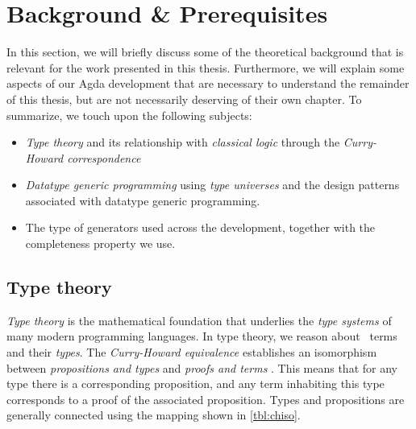 \documentclass[a4paper,msc,twosized=semi]{uustthesis}
\let\oldemph\emph
\renewcommand\emph[1]{{\large\oldemph{#1}}}
\begin{document}
\chapter{Background \& Prerequisites}
In this section, we will briefly discuss some of the theoretical background that is relevant for the work presented in this thesis. Furthermore, we will explain some aspects of our Agda development that are necessary to understand the remainder of this thesis, but are not necessarily deserving of their own chapter. To summarize, we touch upon the following subjects:

\begin{itemize}
  \item
    \emph{Type theory} and its relationship with \emph{classical logic} through the 
    \emph{Curry-Howard correspondence}

  \item 
    \emph{Datatype generic programming} using \emph{type universes} and the design 
    patterns associated with datatype generic programming.  

  \item 
    The type of generators used across the development, together with the completeness property we use. 

\end{itemize}

\section{Type theory}

  \emph{Type theory} is the mathematical foundation that underlies the \emph{type 
  systems} of many modern programming languages. In type theory, we reason about \emph\
  {terms} and their \emph{types}. The \emph{Curry-Howard equivalence} establishes an isomorphism between \emph
  {propositions and types} and \emph{proofs and terms} \cite{wadler2015propositions}. 
  This means that for any type there is a corresponding proposition, and any term 
  inhabiting this type corresponds to a proof of the associated proposition. Types and 
  propositions are generally connected using the mapping shown in \cref{tbl:chiso}.
\end{document}
